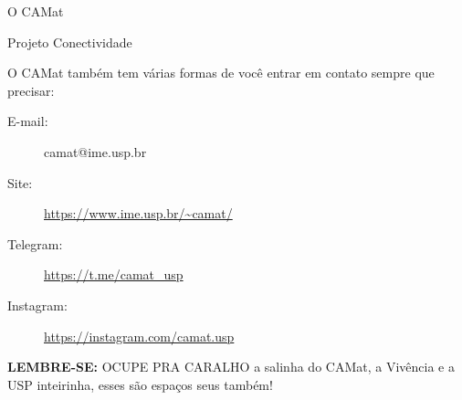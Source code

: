 \begin{secao}{O CAMat}
\begin{subsecao}{Projeto Conectividade}
\end{subsecao}

O CAMat também tem várias formas de você entrar em contato sempre que precisar:

\begin{description}
\item [E-mail:] camat@ime.usp.br
\item [Site:] \url{https://www.ime.usp.br/~camat/}
\item [Telegram:] \url{https://t.me/camat_usp}
\item [Instagram:] \url{https://instagram.com/camat.usp}
\end{description}

\textbf{LEMBRE-SE:} OCUPE PRA CARALHO a salinha do CAMat, a Vivência e a USP inteirinha, esses são espaços seus também!


\end{secao}
